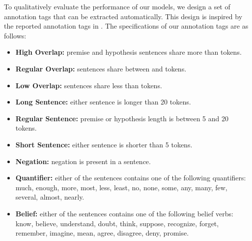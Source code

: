 \documentclass[11pt,a4paper]{article}
\begin{document}
	To qualitatively evaluate the performance of our models, we design a set of annotation tags that can be extracted automatically. This design is inspired by the reported annotation tags in \citet{multinli}. The specifications of our annotation tags are as follows:
	
	
		\begin{itemize}
		\item \textbf{High Overlap:} premise and hypothesis sentences share more than  tokens.
		\item \textbf{Regular Overlap:} sentences share between  and  tokens.
		\item \textbf{Low Overlap:} sentences share less than  tokens.
		\item \textbf{Long Sentence:} either sentence is longer than 20 tokens.
		\item \textbf{Regular Sentence:} premise or hypothesis length is between 5 and 20 tokens.
		\item \textbf{Short Sentence:} either sentence is shorter than 5 tokens.
		\item \textbf{Negation:} negation is present in a sentence.
		\item \textbf{Quantifier:} either of the sentences contains one of the following quantifiers: much, enough, more, most, less, least, no, none, some, any, many, few, several, almost, nearly.
		\item \textbf{Belief:} either of the sentences contains one of the following belief verbs: know, believe, understand, doubt, think, suppose, recognize, forget, remember, imagine, mean, agree, disagree, deny, promise.
	\end{itemize}
	
\end{document}
